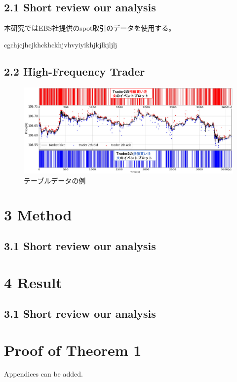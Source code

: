 \documentclass[a4paper,11pt,oneside,openany]{book}
\begin{document}
\section*{2.1 Short review our analysis}
本研究ではEBS社提供のspot取引のデータを使用する。

cgchjcjhcjkhckhckhjvhvyiyikhjkjlkjljlj
\section*{2.2 High-Frequency Trader}
\begin{figure}[htb]
  \centering
  \includegraphics[scale=0.7]{./figures/order_sample.pdf}
  \caption{テーブルデータの例}\label{fig:hs}
\end{figure}



\chapter{3 Method}
\section*{3.1 Short review our analysis}


\chapter{4 Result}
\section*{3.1 Short review our analysis}


\appendix
\chapter{Proof of Theorem 1}
Appendices can be added.
\end{document}
